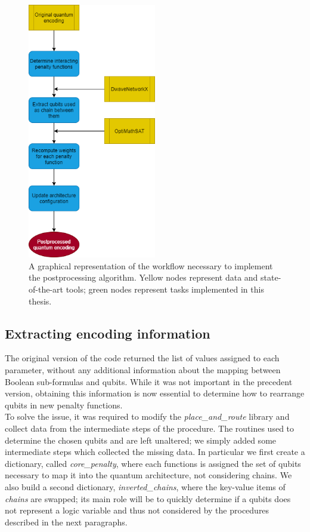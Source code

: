 \begin{figure}[hbt!]
	\begin{center}
	\includegraphics[width=0.5\textwidth]{images/mmmorte.png}
	\caption{A graphical representation of the workflow necessary to implement the postprocessing algorithm. Yellow nodes represent data and state-of-the-art tools; green nodes represent tasks implemented in this thesis.}
	\end{center}
\end{figure}

\subsection{Extracting encoding information}

The original version of the code returned the list of values assigned to each parameter, without any additional information about the mapping between Boolean sub-formulas and qubits. While it was not important in the precedent version, obtaining this information is now essential to determine how to rearrange qubits in new penalty functions. \\
To solve the issue, it was required to modify the \textit{place\_and\_route} library and collect data from the intermediate steps of the procedure. The routines used to determine the chosen qubits and are left unaltered; we simply added some intermediate steps which collected the missing data. In particular we first create a dictionary, called \textit{core\_penalty}, where each functions is assigned the set of qubits necessary to map it into the quantum architecture, not considering chains. We also build a second dictionary, \textit{inverted\_chains}, where the key-value items of \textit{chains} are swapped; its main role will be to quickly determine if a qubits does not represent a logic variable and thus not considered by the procedures described in the next paragraphs.

